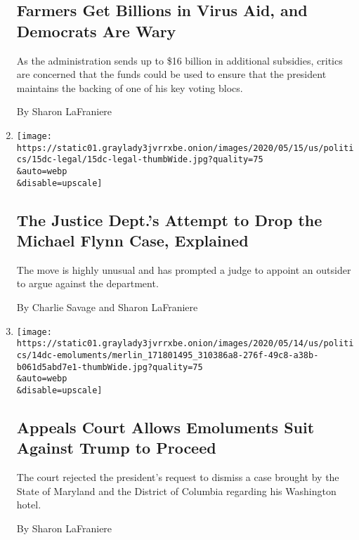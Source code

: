 \begin{enumerate}
  \hypertarget{farmers-get-billions-in-virus-aid-and-democrats-are-wary}{%
  \subsection{Farmers Get Billions in Virus Aid, and Democrats Are
  Wary}\label{farmers-get-billions-in-virus-aid-and-democrats-are-wary}}

  As the administration sends up to \$16 billion in additional
  subsidies, critics are concerned that the funds could be used to
  ensure that the president maintains the backing of one of his key
  voting blocs.

  By Sharon LaFraniere
\item
  \href{/2020/05/15/us/politics/michael-flynn-case-explained.html}{}

  \texttt{[image: https://static01.graylady3jvrrxbe.onion/images/2020/05/15/us/politics/15dc-legal/15dc-legal-thumbWide.jpg?quality=75\\\&auto=webp\\\&disable=upscale]}

  \hypertarget{the-justice-depts-attempt-to-drop-the-michael-flynn-case-explained}{%
  \subsection{The Justice Dept.'s Attempt to Drop the Michael Flynn
  Case,
  Explained}\label{the-justice-depts-attempt-to-drop-the-michael-flynn-case-explained}}

  The move is highly unusual and has prompted a judge to appoint an
  outsider to argue against the department.

  By Charlie Savage and Sharon LaFraniere
\item
  \href{/2020/05/14/us/politics/trump-emoluments-clause-fourth-circuit.html}{}

  \texttt{[image: https://static01.graylady3jvrrxbe.onion/images/2020/05/14/us/politics/14dc-emoluments/merlin\_171801495\_310386a8-276f-49c8-a38b-b061d5abd7e1-thumbWide.jpg?quality=75\\\&auto=webp\\\&disable=upscale]}

  \hypertarget{appeals-court-allows-emoluments-suit-against-trump-to-proceed}{%
  \subsection{Appeals Court Allows Emoluments Suit Against Trump to
  Proceed}\label{appeals-court-allows-emoluments-suit-against-trump-to-proceed}}

  The court rejected the president's request to dismiss a case brought
  by the State of Maryland and the District of Columbia regarding his
  Washington hotel.

  By Sharon LaFraniere
\end{enumerate}

